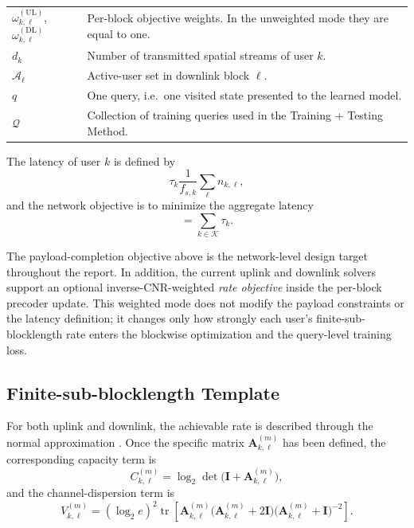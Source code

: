 \documentclass[11pt]{article}
\newcommand{\Kset}{\mathcal{K}}
\newcommand{\Aset}{\mathcal{A}}
\newcommand{\Qset}{\mathcal{Q}}
\newcommand{\I}{\mathbf{I}}
\newcommand{\A}{\mathbf{A}}
\newcommand{\tr}{\operatorname{tr}}
\newcommand{\UL}{\mathrm{UL}}
\newcommand{\DL}{\mathrm{DL}}
\begin{document}
\begin{table}[ht]
\begin{tabularx}{\textwidth}{>{\raggedright\arraybackslash}p{} X}
$\omega_{k,\ell}^{(\UL)}$, $\omega_{k,\ell}^{(\DL)}$ & Per-block objective weights. In the unweighted mode they are equal to one. \\
$d_k$ & Number of transmitted spatial streams of user $k$. \\
$\Aset_\ell$ & Active-user set in downlink block $\ell$. \\
$q$ & One query, i.e.\ one visited state presented to the learned model. \\
$\Qset$ & Collection of training queries used in the Training + Testing Method. \\
\bottomrule
\end{tabularx}
\end{table}

The latency of user $k$ is defined by
\begin{equation}
\tau_k
\frac{1}{f_{s,k}}
\sum_{\ell} n_{k,\ell},
\label{eq:latency-user}
\end{equation}
and the network objective is to minimize the aggregate latency
\begin{equation}
=
\sum_{k\in\Kset}\tau_k.
\label{eq:latency-sum}
\end{equation}

The payload-completion objective above is the network-level design target
throughout the report. In addition, the current uplink and downlink solvers
support an optional inverse-CNR-weighted \emph{rate objective} inside the
per-block precoder update. This weighted mode does not modify the payload
constraints or the latency definition; it changes only how strongly each user's
finite-sub-blocklength rate enters the blockwise optimization and the
query-level training loss.

\subsection{Finite-sub-blocklength Template}

For both uplink and downlink, the achievable rate is described through the normal
approximation \cite{polyanskiy2010}. Once the specific  matrix
$\A_{k,\ell}^{(m)}$ has been defined, the corresponding capacity term is
\begin{equation}
C_{k,\ell}^{(m)}
=
\log_2\det\!\bigl(\I+\A_{k,\ell}^{(m)}\bigr),
\label{eq:common-C}
\end{equation}
and the channel-dispersion term is
\begin{equation}
V_{k,\ell}^{(m)}
=
(\log_2 e)^2
\tr\!\left[
\A_{k,\ell}^{(m)}
\bigl(\A_{k,\ell}^{(m)}+2\I\bigr)
\bigl(\A_{k,\ell}^{(m)}+\I\bigr)^{-2}
\right].
\label{eq:common-V}
\end{equation}
\end{document}
